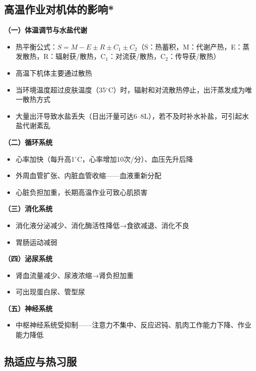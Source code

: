 \subsection{高温作业对机体的影响*}

\begin{keybox}
\textbf{（一）体温调节与水盐代谢}
\begin{itemize}[leftmargin=*]
    \item 热平衡公式：$S = M - E \pm R \pm C_1 \pm C_2$（S：热蓄积，M：代谢产热，E：蒸发散热，R：辐射获/散热，C$_1$：对流获/散热，C$_2$：传导获/散热）
    \item 高温下机体主要通过散热
    \item 当环境温度超过皮肤温度（35$^\circ$C）时，辐射和对流散热停止，出汗蒸发成为唯一散热方式
    \item 大量出汗导致水盐丢失（日出汗量可达6--8L），若不及时补水补盐，可引起水盐代谢紊乱
\end{itemize}

\textbf{（二）循环系统}
\begin{itemize}[leftmargin=*]
    \item 心率加快（每升高1$^\circ$C，心率增加10次/分）、血压先升后降
    \item 外周血管扩张、内脏血管收缩——血液重新分配
    \item 心脏负担加重，长期高温作业可致心肌损害
\end{itemize}

\textbf{（三）消化系统}
\begin{itemize}[leftmargin=*]
    \item 消化液分泌减少、消化酶活性降低→食欲减退、消化不良
    \item 胃肠运动减弱
\end{itemize}

\textbf{（四）泌尿系统}
\begin{itemize}[leftmargin=*]
    \item 肾血流量减少、尿液浓缩→肾负担加重
    \item 可出现蛋白尿、管型尿
\end{itemize}

\textbf{（五）神经系统}
\begin{itemize}[leftmargin=*]
    \item 中枢神经系统受抑制——注意力不集中、反应迟钝、肌肉工作能力下降、作业能力降低
\end{itemize}
\end{keybox}

\subsection{热适应与热习服}

